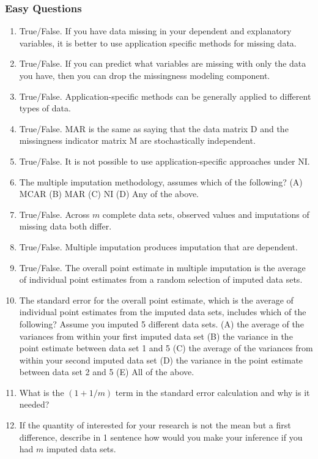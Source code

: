 \documentclass[11pt]{article}
\begin{document}
\subsubsection{Easy Questions}
\begin{enumerate}
\item True/False. If you have data missing in your dependent and explanatory variables, it is better to use application specific methods for missing data.
\item True/False. If you can predict what variables are missing with only the data you have, then you can drop the missingness modeling component.
\item True/False. Application-specific methods can be generally applied to different types of data.
\item True/False. MAR is the same as saying that the data matrix D and the missingness indicator matrix M are stochastically independent.
\item True/False. It is not possible to use application-specific approaches under NI.
\item The multiple imputation methodology, assumes which of the following? (A) MCAR (B) MAR (C) NI (D) Any of the above.
\item True/False. Across $m$ complete data sets, observed values and imputations of missing data both differ.
\item True/False. Multiple imputation produces imputation that are dependent.
\item True/False. The overall point estimate in multiple imputation is the average of individual point estimates from a random selection of imputed data sets.
\item The standard error for the overall point estimate, which is the average of individual point estimates from the imputed data sets, includes which of the following? Assume you imputed 5 different data sets. (A) the average of the variances from within your first imputed data set (B) the variance in the point estimate between data set 1 and 5 (C) the average of the variances from within your second imputed data set (D) the variance in the point estimate between data set 2 and 5 (E) All of the above.
\item What is the $(1 + 1/m)$ term in the standard error calculation and why is it needed?
\item If the quantity of interested for your research is not the mean but a first difference, describe in 1 sentence how would you make your inference if you had $m$ imputed data sets.
\end{enumerate}
\end{document}
